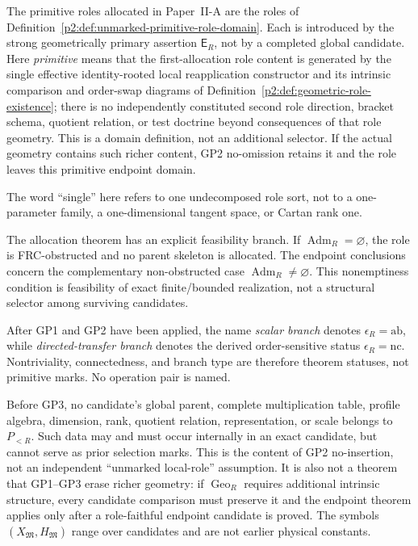 \documentclass[12pt,a4paper]{article}
\begin{document}
\begin{definition}
\label{p2:def:primitive-role-unmarked-applicability}
The primitive roles allocated in Paper~II-A are the roles of
Definition~\ref{p2:def:unmarked-primitive-role-domain}.  Each is introduced by
the strong geometrically primary assertion \(\mathsf E_R\), not by a completed
global candidate.  Here \emph{primitive} means that the first-allocation role
content is generated by the single effective identity-rooted local
reapplication constructor and its intrinsic comparison and order-swap diagrams
of Definition~\ref{p2:def:geometric-role-existence}; there is no independently
constituted second role direction, bracket schema, quotient relation, or test
doctrine beyond consequences of that role geometry.  This is a domain
definition, not an additional selector.  If the actual geometry contains such
richer content, GP2 no-omission retains it and the role leaves this primitive
endpoint domain.

The word ``single'' here refers to one undecomposed role sort, not to a
one-parameter family, a one-dimensional tangent space, or Cartan rank one.

The allocation theorem has an explicit feasibility branch.  If
\(\operatorname{Adm}_R=\varnothing\), the role is FRC-obstructed and no parent
skeleton is allocated.  The endpoint conclusions concern the complementary
non-obstructed case \(\operatorname{Adm}_R\ne\varnothing\).  This nonemptiness
condition is feasibility of exact finite/bounded realization, not a structural
selector among surviving candidates.

After GP1 and GP2 have been applied, the name \emph{scalar
branch} denotes \(\epsilon_R=\mathrm{ab}\), while
\emph{directed-transfer branch} denotes the derived order-sensitive status
\(\epsilon_R=\mathrm{nc}\).  Nontriviality, connectedness, and branch type are
therefore theorem statuses, not primitive marks.  No operation pair is named.

Before GP3, no candidate's global parent, complete multiplication table,
profile algebra, dimension, rank, quotient relation, representation, or scale
belongs to \(P_{<R}\).  Such data may and must occur internally in an exact
candidate, but cannot serve as prior selection marks.  This is the content of
GP2 no-insertion, not an independent ``unmarked local-role'' assumption.  It
is also not a theorem that GP1--GP3 erase richer geometry: if
\(\operatorname{Geo}_R\) requires additional intrinsic structure, every
candidate comparison must preserve it and the endpoint theorem applies only
after a role-faithful endpoint candidate is proved.  The symbols
\((X_{\mathfrak M},H_{\mathfrak M})\) range over candidates and are not
earlier physical constants.
\end{definition}
\end{document}
